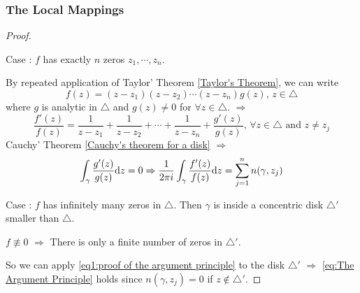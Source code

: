 \subsubsection{The Local Mappings}
\begin{proof}
    \,

    Case \uppercase\expandafter{}:  $ f $ has exactly  $ n $ zeros  $ z_1,\cdots,z_n $.
    
    By repeated application of Taylor' Theorem \ref{Taylor's Theorem}, we can write 
    \begin{equation}
        f(z)=(z-z_1)(z-z_2)\cdots(z-z_n)g(z),\,z\in\triangle
    \end{equation}
    where  $ g $ is analytic in  $ \triangle $ and  $ g(z)\neq0 $ for  $ \forall z\in \triangle $.
    $ \Rightarrow  $
    \begin{equation}
        \frac{f'(z)}{f(z)}=\frac{1}{z-z_1}+\frac{1}{z-z_2}+\cdots+\frac{1}{z-z_n}+\frac{g'(z)}{g(z)},\,\forall z\in\triangle\text{ and }z\neq z_j
    \end{equation}  
    Cauchy' Theorem \ref{Cauchy's theorem for a disk} $ \Rightarrow $ 
    \begin{equation}
        \displaystyle\int_\gamma\frac{g'(z)}{g(z)}\mathrm{d}z=0 \Rightarrow  \displaystyle\frac{1}{2\pi i}\int_\gamma\frac{f'(z)}{f(z)}\mathrm{d}z=\displaystyle\sum_{j=1}^nn(\gamma,z_j)\label{eq1:proof of the argument principle}
    \end{equation}  
    
    Case \uppercase\expandafter{}:  $ f $ has infinitely many zeros in  $ \triangle $. Then  $ \gamma $ is inside a concentric disk  $ \triangle' $ smaller than  $ \triangle $.

    $ f\not\equiv 0 $ $ \Rightarrow $ There is only a finite number of zeros in  $ \triangle' $.
    
    So we can apply \eqref{eq1:proof of the argument principle} to the disk  $ \triangle' $  $ \Rightarrow $ \eqref{eq:The Argument Principle} holds since  $ n(\gamma,z_j)=0 $ if  $ z\not\in\triangle' $.  
\end{proof}
